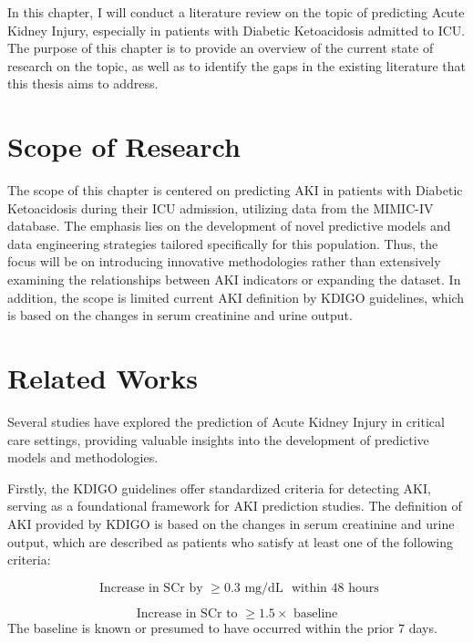 \documentclass[../main.tex]{subfiles}
\begin{document}
\par In this chapter, I will conduct a literature review on the topic of predicting Acute Kidney Injury, especially in patients with Diabetic Ketoacidosis admitted to ICU. 
The purpose of this chapter is to provide an overview of the current state of research on the topic, as well as to identify the gaps in the existing literature that this thesis aims to address.


\section{Scope of Research}
The scope of this chapter is centered on predicting AKI in patients with Diabetic Ketoacidosis  during their ICU admission, utilizing data from the MIMIC-IV database. 
The emphasis lies on the development of novel predictive models and data engineering strategies tailored specifically for this population.
Thus, the focus will be on introducing innovative methodologies rather than extensively examining the relationships between AKI indicators or expanding the dataset.
In addition, the scope is limited current AKI definition by KDIGO guidelines, which is based on the changes in serum creatinine and urine output.


\section{Related Works}

Several studies have explored the prediction of Acute Kidney Injury in critical care settings, providing valuable insights into the development of predictive models and methodologies. 

Firstly, the KDIGO guidelines offer standardized criteria for detecting AKI, serving as a foundational framework for AKI prediction studies.
The definition of AKI provided by KDIGO is based on the changes in serum creatinine and urine output, which are described as patients who satisfy at least one of the following criteria:

\begin{equation}
    \text{ Increase in SCr by } \geq 0.3 \text{ mg/dL } \text{ within 48 hours}
\end{equation}

\begin{equation}
    \text{ Increase in SCr to } \geq 1.5 \times \text{ baseline }
\end{equation}
The baseline is known or presumed to have occurred within the prior 7 days.
\end{document}
